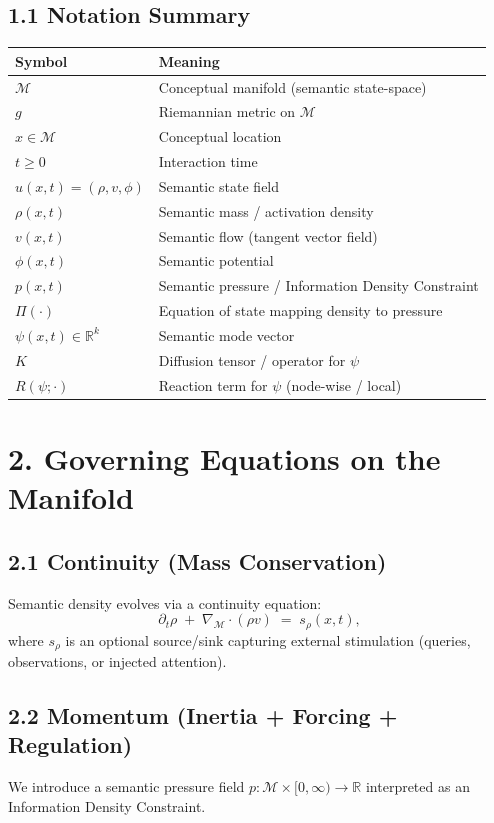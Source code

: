 \documentclass[11pt]{article}
\begin{document}
\subsection*{1.1 Notation Summary}
\begin{center}
\begin{tabular}{@{}ll@{}}
\toprule
Symbol & Meaning \\
\midrule
$\mathcal{M}$ & Conceptual manifold (semantic state-space) \\
$g$ & Riemannian metric on $\mathcal{M}$ \\
$x\in\mathcal{M}$ & Conceptual location \\
$t\ge 0$ & Interaction time \\
$u(x,t)=(\rho,v,\phi)$ & Semantic state field \\
$\rho(x,t)$ & Semantic mass / activation density \\
$v(x,t)$ & Semantic flow (tangent vector field) \\
$\phi(x,t)$ & Semantic potential \\
$p(x,t)$ & Semantic pressure / Information Density Constraint \\
$\Pi(\cdot)$ & Equation of state mapping density to pressure \\
$\psi(x,t)\in\mathbb{R}^k$ & Semantic mode vector \\
$K$ & Diffusion tensor / operator for $\psi$ \\
$R(\psi;\cdot)$ & Reaction term for $\psi$ (node-wise / local) \\
\bottomrule
\end{tabular}
\end{center}

\section*{2. Governing Equations on the Manifold}

\subsection*{2.1 Continuity (Mass Conservation)}
Semantic density evolves via a continuity equation:
\begin{equation}
\partial_t \rho \;+\; \nabla_{\mathcal{M}}\cdot(\rho v) \;=\; s_\rho(x,t),
\end{equation}
where $s_\rho$ is an optional source/sink capturing external stimulation (queries, observations, or injected attention).

\subsection*{2.2 Momentum (Inertia + Forcing + Regulation)}
We introduce a semantic pressure field $p:\mathcal{M}\times[0,\infty)\to\mathbb{R}$ interpreted as an Information Density Constraint.
\end{document}
